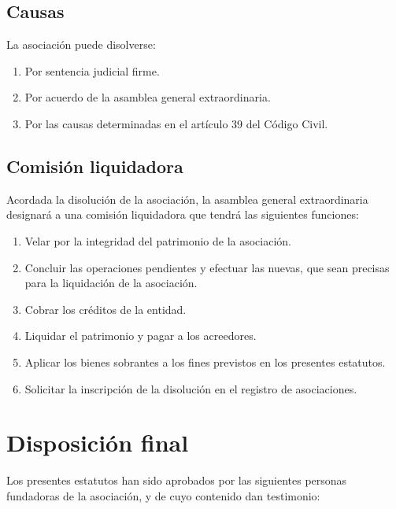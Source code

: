 \documentclass[a4paper, 12pt, oneside]{book}
\begin{document}
\section{Causas}

La asociación puede disolverse:

\begin{enumerate}
    \item Por sentencia judicial firme.  
    \item Por acuerdo de la asamblea general extraordinaria.  
    \item Por las causas determinadas en el artículo 39 del Código Civil.
\end{enumerate}

\section{Comisión liquidadora}

Acordada la disolución de la asociación, la asamblea general extraordinaria designará a una comisión liquidadora que tendrá las siguientes funciones:

\begin{enumerate}
    \item Velar por la integridad del patrimonio de la asociación.  
    \item Concluir las operaciones pendientes y efectuar las nuevas, que sean precisas para la liquidación de la asociación.  
    \item Cobrar los créditos de la entidad.  
    \item Liquidar el patrimonio y pagar a los acreedores.  
    \item Aplicar los bienes sobrantes a los fines previstos en los presentes estatutos.  
    \item Solicitar la inscripción de la disolución en el registro de asociaciones.
\end{enumerate}

\chapter*{Disposición final}

Los presentes estatutos han sido aprobados por las siguientes personas fundadoras de la asociación, y de cuyo contenido dan testimonio:
\end{document}
